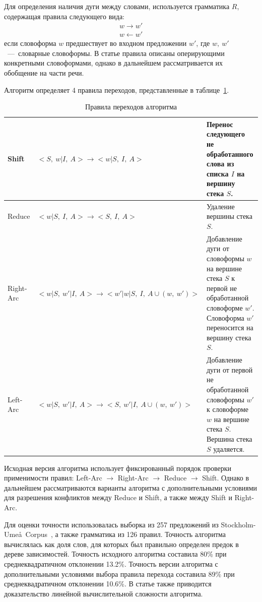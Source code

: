 Для определения наличия дуги между словами, используется грамматика $R$, содержащая правила следующего вида:
\begin{equation}
	\begin{split}
		w \rightarrow w' \\
		w \leftarrow w'
	\end{split}
\end{equation}
если словоформа $w$ предшествует во входном предложении $w'$, где $w,\ w'$~---~словарные словоформы. В статье правила описаны оперирующими конкретными словоформами, однако в дальнейшем рассматривается их обобщение на части речи.

Алгоритм определяет 4 правила переходов, представленные в таблице~\ref{tab:shift_reduce_rules}.
 \begin{table}[H]
	\centering
	\caption{Правила переходов алгоритма}
	\begin{tabular}{|p{1.8cm}|p{7cm}|p{6.5cm}|}
		\hline
		Shift & $<S,\ w|I,\ A> \rightarrow <w|S,\ I,\ A>$ & Перенос следующего не обработанного слова из списка $I$ на вершину стека $S$.\\\hline
		Reduce & $<w|S,\ I,\ A> \rightarrow <S,\ I,\ A>$ & Удаление вершины стека $S$.\\\hline
		Right-Arc & $<w|S,\ w'|I,\ A> \rightarrow <w'|w|S,\ I,\ A\cup {(w,\ w')}>$ & Добавление дуги от словоформы $w$ на вершине стека $S$ к первой не обработанной словоформе $w'$. Словоформа $w'$ переносится на вершину стека $S$.\\\hline
		Left-Arc & $<w|S,\ w'|I,\ A> \rightarrow <S,\ w'|I,\ A\cup {(w,\ w')}>$ & Добавление дуги от первой не обработанной словоформы $w'$ к словоформе $w$ на вершине стека $S$. Вершина стека $S$ удаляется.\\\hline
	\end{tabular}
	\label{tab:shift_reduce_rules}
\end{table}

Исходная версия алгоритма использует фиксированный порядок проверки применимости правил: Left-Arc $\rightarrow$ Right-Arc $\rightarrow$ Reduce $\rightarrow$ Shift. Однако в дальнейшем рассматриваются варианты алгоритма с дополнительными условиями для разрешения конфликтов между Reduce и Shift, а также между Shift и Right-Arc.

Для оценки точности использовалась выборка из 257 предложений из Stockholm-Ume\aa\ Corpus~\cite{suc1997}, а также грамматика из 126 правил. Точность алгоритма вычислялась как доля слов, для которых был правильно определен предок в дереве зависимостей. Точность исходного алгоритма составила 80\% при среднеквадратичном отклонении 13.2\%. Точность версии алгоритма с дополнительными условиями выбора правила перехода составила 89\% при среднеквадратичном отклонении 10.6\%. В статье также приводится доказательство линейной вычислительной сложности алгоритма.

